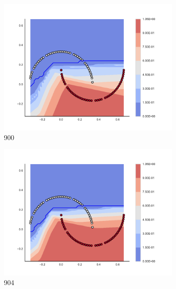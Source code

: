         \begin{figure}[h]\ContinuedFloat
        
\begin{subfigure}[b]{0.09\textwidth}
    \includegraphics[clip, trim=2.35cm 1.75cm 4.5cm 0cm,width=\textwidth]{img/convergence/900.pdf}
    \caption{900}
    \label{fig:convergence_900}
\end{subfigure}
%
\begin{subfigure}[b]{0.09\textwidth}
    \includegraphics[clip, trim=2.35cm 1.75cm 4.5cm 0cm,width=\textwidth]{img/convergence/904.pdf}
    \caption{904}
    \label{fig:convergence_904}
\end{subfigure}
%
\begin{subfigure}[b]{0.09\textwidth}

\end{subfigure}
\end{figure}
